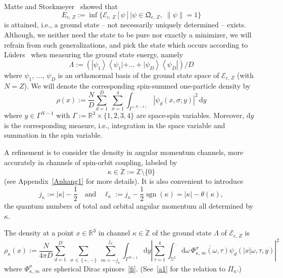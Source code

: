 \documentclass[10pt]{amsart}
\theoremstyle{definition}
\DeclareMathOperator{\sgn}{sgn}
\newcommand*\rd{\mathrm{d}}
\newcommand*\dy{\mathrm{d}y}
\newcommand{\bbS}{\mathbb{S}}
\newcommand*\gz{\mathbb{Z}}
\newcommand*\rz{\mathbb{R}}
\newcommand*\zp{\dot{\gz}}
\newcommand*\cE{\mathcal{E}}
\newcommand*\gQ{\mathfrak{Q}}
\begin{document}
Matte and Stockmeyer~\cite[Theorem~2.2]{MatteStockmeyer2010} showed that
\begin{equation}\label{gs}
E_{c,\,Z}:=\inf\big\{\cE_{c,\,Z}[\psi]\big| \psi\in\gQ_{c,\,Z},\; \|\psi\|=1\big\}
\end{equation}
is attained, i.e., a ground state -- not necessarily uniquely determined -- exists. Although, we neither need the state to be pure nor exactly a minimizer, we will refrain from such generalizations, and pick the state which occurs according to Lüders~\cite{Luders1951} when measuring the ground state energy, namely
\[
\Lambda:=\left(\left|\psi_1\right\rangle\left\langle\psi_1|+\dots+|\psi_D\right\rangle\left\langle\psi_D\right|\right)/D
\]
where $\psi_1,\,\dots,\,\psi_D$ is an orthonormal basis of the ground state space of $\cE_{c,\,Z}$ (with $N=Z$). We will denote the corresponding spin-summed one-particle density by
\begin{equation}\label{gsd}
\rho(x) := \frac ND \sum_{d=1}^D\;\sum_{\sigma=1}^4\int_{\Gamma^{(N-1)}} \left|\psi_d\left(x,\sigma;y\right)\right|^2\,\dy
\end{equation}
where $y\in\Gamma^{N-1}$ with $\Gamma:=\rz^3\times\{1,2,3,4\}$ are space-spin variables. Moreover, $\rd y$ is the corresponding measure, i.e., integration in the space variable and summation in the spin variable.


A refinement is to consider the density in angular momentum channels, more accurately in channels of spin-orbit coupling, labeled by
\begin{equation}\label{zp}
\kappa\in\zp:=\gz\setminus\{0\}
\end{equation}
(see Appendix~\ref{Anhang1} for more details). It is also convenient to introduce
\begin{equation}\label{l}
j_\kappa:=|\kappa|-\frac12\quad \text{and}\quad
\ell_\kappa:= j_\kappa-\frac12\sgn(\kappa)= |\kappa|-\theta(\kappa),
\end{equation}
the quantum numbers of total and orbital angular momentum all determined by $\kappa$.

The density at a point $x\in\rz^3$ in channel $\kappa\in\zp$ of the ground state $\Lambda$ of $\cE_{c,\,Z}$ is
\begin{equation}\label{eq:furryangdensity}
\rho_{\kappa}(x):= \frac{N}{4\pi D}\sum_{d=1}^D\;\sum_{\sigma\,\in\,\{+,\,-\}}\;\sum_{m=-j_\kappa}^{j_\kappa}\int_{\Gamma^{N-1}}\rd y
\left|\sum_{\tau=1}^4\int_{\bbS^2}\rd \omega\,
\overline{\Phi_{\kappa,\,m}^\sigma(\omega,\tau)}
\psi_d(|x|\omega,\tau,y)\right|^2
\end{equation}
where $\Phi^\sigma_{\kappa,\,m}$ are spherical Dirac spinors~\eqref{fi}. (See~\eqref{a1} for the relation to $\Pi_\kappa$.)
\end{document}

